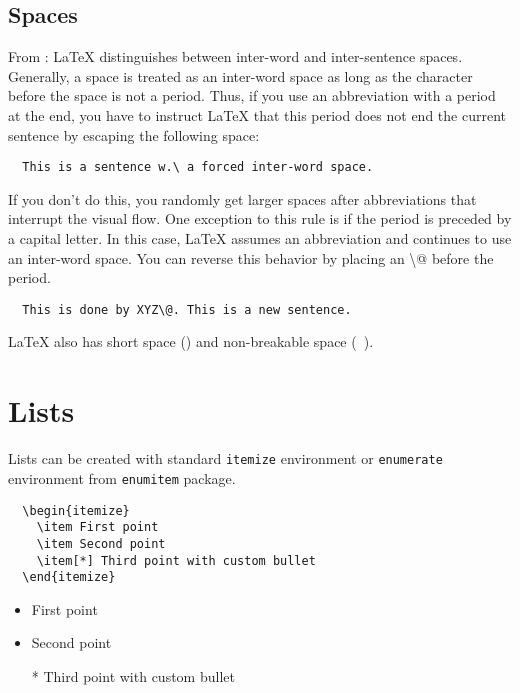 \subsection{Spaces}
From  \autocite{JohannesWienke-2018}:
\LaTeX{} distinguishes between inter-word and inter-sentence spaces.
Generally, a space is treated as an inter-word space as long as the character before the space is not a period.
Thus, if you use an abbreviation with a period at the end, you have to instruct \LaTeX{} that this period does not end the current sentence by escaping the following space:
\begin{verbatim}
  This is a sentence w.\ a forced inter-word space.
\end{verbatim}

If you don’t do this, you randomly get larger spaces after abbreviations that interrupt the visual flow.
One exception to this rule is if the period is preceded by a capital letter.
In this case, \LaTeX{} assumes an abbreviation and continues to use an inter-word space.
You can reverse this behavior by placing an \textbackslash @ before the period.
\begin{verbatim}
  This is done by XYZ\@. This is a new sentence.
\end{verbatim}

\LaTeX{} also has short space (\texttt{\:}) and non-breakable space (\texttt{~}).

\section{Lists}
Lists can be created with standard \texttt{itemize} environment or \texttt{enumerate} environment from \texttt{enumitem} package.
\begin{verbatim}
  \begin{itemize}
    \item First point
    \item Second point
    \item[*] Third point with custom bullet
  \end{itemize}
\end{verbatim}

\begin{mdframed}[style=example]
  \begin{itemize}
    \item First point
    \item Second point
    \item[*] Third point with custom bullet
  \end{itemize}
\end{mdframed}


